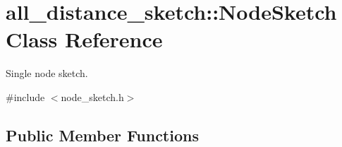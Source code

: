 \hypertarget{classall__distance__sketch_1_1NodeSketch}{}\section{all\+\_\+distance\+\_\+sketch\+:\+:Node\+Sketch Class Reference}
\label{classall__distance__sketch_1_1NodeSketch}


Single node sketch.  




{\ttfamily \#include $<$node\+\_\+sketch.\+h$>$}

\subsection*{Public Member Functions}
